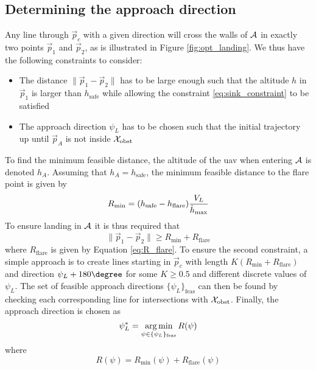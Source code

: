 \subsection{Determining the approach direction}
Any line through $\vec{p}_c$ with a given direction will cross the walls of $\mathcal{A}$ in exactly two points $\vec{p}_1$ and $\vec{p}_2$, as is illustrated in Figure \ref{fig:opt_landing}. 
We thus have the following constraints to consider:
\begin{itemize}
    \item The distance $\|\vec{p}_1-\vec{p}_2\|$ has to be large enough such that the altitude $h$ in $\vec{p}_1$ is larger than $h_{\text{safe}}$ while allowing 
    the constraint \eqref{eq:sink_constraint} to be satisfied
    \item The approach direction $\psi_L$ has to be chosen such that the initial trajectory up until $\vec{p}_A$ is not inside $\mathcal{X}_{\text{obst}}$
\end{itemize}
To find the minimum feasible distance, the altitude of the \ac{uav} when entering $\mathcal{A}$ is denoted $h_A$.
Assuming that $h_A=h_{\text{safe}}$, the minimum feasible distance to the flare point is given by
\begin{equation}
    R_{\text{min}}=(h_{\text{safe}}-h_{\text{flare}})\frac{V_L}{\dot{h}_{\text{max}}}
\end{equation}
To ensure landing in $\mathcal{A}$ it is thus required that 
\begin{equation}
    \|\vec{p}_1-\vec{p}_2\|\geq R_{\text{min}}+R_{\text{flare}}
\end{equation}
where $R_{\text{flare}}$ is given by Equation \eqref{eq:R_flare}. To ensure the second constraint, a simple approach is to 
create lines starting in $\vec{p}_c$ with length $K(R_{\text{min}}+R_{\text{flare}})$ and direction $\psi_L+180\degree$ for some $K\geq0.5$ and different discrete values of $\psi_L$. 
The set of feasible approach directions $\{\psi_{L}\}_{\text{feas}}$ can then be found by checking each corresponding line for intersections with $\mathcal{X}_{\text{obst}}$. Finally, the approach direction is 
chosen as 
\begin{equation}
    \psi_{L}^* = \operatorname*{arg\,\text{min}}_{\psi\in\{\psi_{L}\}_{\text{feas}}}R(\psi)
\end{equation}
where
\begin{equation}
    R(\psi)=R_{\text{min}}(\psi) + R_{\text{flare}}(\psi)
\end{equation}


